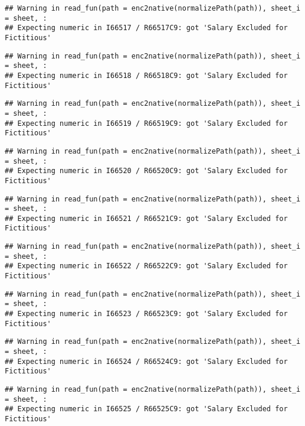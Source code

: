 \documentclass[
]{article}
\begin{document}
\begin{verbatim}
## Warning in read_fun(path = enc2native(normalizePath(path)), sheet_i = sheet, :
## Expecting numeric in I66517 / R66517C9: got 'Salary Excluded for Fictitious'
\end{verbatim}

\begin{verbatim}
## Warning in read_fun(path = enc2native(normalizePath(path)), sheet_i = sheet, :
## Expecting numeric in I66518 / R66518C9: got 'Salary Excluded for Fictitious'
\end{verbatim}

\begin{verbatim}
## Warning in read_fun(path = enc2native(normalizePath(path)), sheet_i = sheet, :
## Expecting numeric in I66519 / R66519C9: got 'Salary Excluded for Fictitious'
\end{verbatim}

\begin{verbatim}
## Warning in read_fun(path = enc2native(normalizePath(path)), sheet_i = sheet, :
## Expecting numeric in I66520 / R66520C9: got 'Salary Excluded for Fictitious'
\end{verbatim}

\begin{verbatim}
## Warning in read_fun(path = enc2native(normalizePath(path)), sheet_i = sheet, :
## Expecting numeric in I66521 / R66521C9: got 'Salary Excluded for Fictitious'
\end{verbatim}

\begin{verbatim}
## Warning in read_fun(path = enc2native(normalizePath(path)), sheet_i = sheet, :
## Expecting numeric in I66522 / R66522C9: got 'Salary Excluded for Fictitious'
\end{verbatim}

\begin{verbatim}
## Warning in read_fun(path = enc2native(normalizePath(path)), sheet_i = sheet, :
## Expecting numeric in I66523 / R66523C9: got 'Salary Excluded for Fictitious'
\end{verbatim}

\begin{verbatim}
## Warning in read_fun(path = enc2native(normalizePath(path)), sheet_i = sheet, :
## Expecting numeric in I66524 / R66524C9: got 'Salary Excluded for Fictitious'
\end{verbatim}

\begin{verbatim}
## Warning in read_fun(path = enc2native(normalizePath(path)), sheet_i = sheet, :
## Expecting numeric in I66525 / R66525C9: got 'Salary Excluded for Fictitious'
\end{verbatim}
\end{document}
